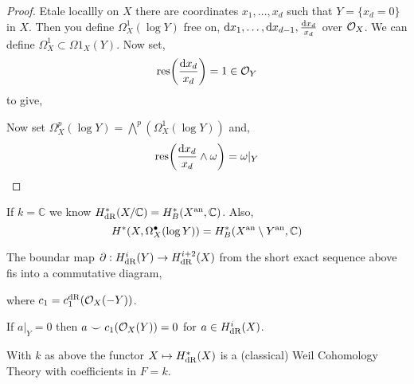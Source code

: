 \documentclass[12pt]{article}
\begin{document}
\begin{proof}
Etale locallly on $X$ there are coordinates $x_1, \dots, x_d$ such that $Y = \{ x_d = 0 \}$ in $X$. Then you define $\Omega^1_X(\log{Y})$ free on, $\mathrm{d}{x_1}, \dots, \mathrm{d}{x_{d-1}}, \frac{\mathrm{d}{x_d}}{x_d}$ over $\mathcal{O}_{X}$. We can define $\Omega_X^1 \subset \Omega1_X(Y)$. Now set,
\[ \mathrm{res}{\left( \frac{\mathrm{d}{x_d}}{x_d} \right)} = 1 \in \mathcal{O}_{Y} \]
to give,
\begin{center}
\end{center}
Now set $\Omega^p_X(\log{Y}) = \bigwedge^p (\Omega^1_X(\log{Y}))$ and,
\[ \mathrm{res}{\left( \frac{\mathrm{d}{x_d}}{x_d} \wedge \omega \right)} = \omega |_Y \]
\end{proof}

\renewcommand{\C}{\mathbb{C}}

\begin{remark}
If $k = \C$ we know $H^*_{\dR}(X/\C) = H^*_B(X^\an, \C)$. Also,
\[ H^*(X, \Omega^\bullet_X(\log{Y})) = H^*_B(X^\an \setminus Y^\an, \C) \]
\end{remark}

\begin{proposition}
The boundar map $\partial : H^i_{\mathrm{dR}}(Y) \to H^{i + 2}_{\mathrm{dR}}(X)$ from the short exact sequence above fis into a commutative diagram,
\begin{center}
\end{center}
where $c_1 = c_1^{\mathrm{dR}}(\mathcal{O}_{X}(-Y))$. 
\end{proposition}

\begin{corollary}
If $a|_Y = 0$ then $a \smile c_1(\mathcal{O}_{X}(Y)) = 0$ for $a \in H^i_{\mathrm{dR}}(X)$.
\end{corollary}

\begin{theorem}
With $k$ as above the functor $X \mapsto H^*_{\mathrm{dR}}(X)$ is a (classical) Weil Cohomology Theory with coefficients in $F = k$. 
\end{theorem}

\newcommand{\R}{\mathbb{R}}
\end{document}
